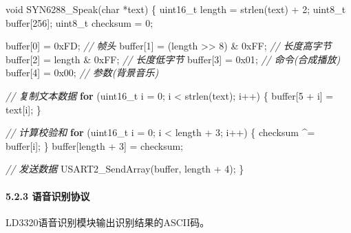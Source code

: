 \documentclass[
]{article}
\newenvironment{Shaded}{}{}
\newcommand{\BaseNTok}[1]{\textcolor[rgb]{0.25,0.63,0.44}{#1}}
\newcommand{\CommentTok}[1]{\textcolor[rgb]{0.38,0.63,0.69}{\textit{#1}}}
\newcommand{\ControlFlowTok}[1]{\textcolor[rgb]{0.00,0.44,0.13}{\textbf{#1}}}
\newcommand{\DataTypeTok}[1]{\textcolor[rgb]{0.56,0.13,0.00}{#1}}
\newcommand{\DecValTok}[1]{\textcolor[rgb]{0.25,0.63,0.44}{#1}}
\newcommand{\NormalTok}[1]{#1}
\begin{document}
\begin{Shaded}
\begin{Highlighting}[]
\DataTypeTok{void}\NormalTok{ SYN6288\_Speak(}\DataTypeTok{char}\NormalTok{ *text)}
\NormalTok{\{}
    \DataTypeTok{uint16\_t}\NormalTok{ length = strlen(text) + }\DecValTok{2}\NormalTok{;}
    \DataTypeTok{uint8\_t}\NormalTok{ buffer[}\DecValTok{256}\NormalTok{];}
    \DataTypeTok{uint8\_t}\NormalTok{ checksum = }\DecValTok{0}\NormalTok{;}
    
\NormalTok{    buffer[}\DecValTok{0}\NormalTok{] = }\BaseNTok{0xFD}\NormalTok{;                    }\CommentTok{// 帧头}
\NormalTok{    buffer[}\DecValTok{1}\NormalTok{] = (length \textgreater{}\textgreater{} }\DecValTok{8}\NormalTok{) \& }\BaseNTok{0xFF}\NormalTok{;    }\CommentTok{// 长度高字节}
\NormalTok{    buffer[}\DecValTok{2}\NormalTok{] = length \& }\BaseNTok{0xFF}\NormalTok{;           }\CommentTok{// 长度低字节}
\NormalTok{    buffer[}\DecValTok{3}\NormalTok{] = }\BaseNTok{0x01}\NormalTok{;                    }\CommentTok{// 命令(合成播放)}
\NormalTok{    buffer[}\DecValTok{4}\NormalTok{] = }\BaseNTok{0x00}\NormalTok{;                    }\CommentTok{// 参数(背景音乐)}
    
    \CommentTok{// 复制文本数据}
    \ControlFlowTok{for}\NormalTok{ (}\DataTypeTok{uint16\_t}\NormalTok{ i = }\DecValTok{0}\NormalTok{; i \textless{} strlen(text); i++) \{}
\NormalTok{        buffer[}\DecValTok{5}\NormalTok{ + i] = text[i];}
\NormalTok{    \}}
    
    \CommentTok{// 计算校验和}
    \ControlFlowTok{for}\NormalTok{ (}\DataTypeTok{uint16\_t}\NormalTok{ i = }\DecValTok{0}\NormalTok{; i \textless{} length + }\DecValTok{3}\NormalTok{; i++) \{}
\NormalTok{        checksum \^{}= buffer[i];}
\NormalTok{    \}}
\NormalTok{    buffer[length + }\DecValTok{3}\NormalTok{] = checksum;}
    
    \CommentTok{// 发送数据}
\NormalTok{    USART2\_SendArray(buffer, length + }\DecValTok{4}\NormalTok{);}
\NormalTok{\}}
\end{Highlighting}
\end{Shaded}

\hypertarget{ux8bedux97f3ux8bc6ux522bux534fux8bae}{%
\paragraph{5.2.3
语音识别协议}\label{ux8bedux97f3ux8bc6ux522bux534fux8bae}}

LD3320语音识别模块输出识别结果的ASCII码。
\end{document}
